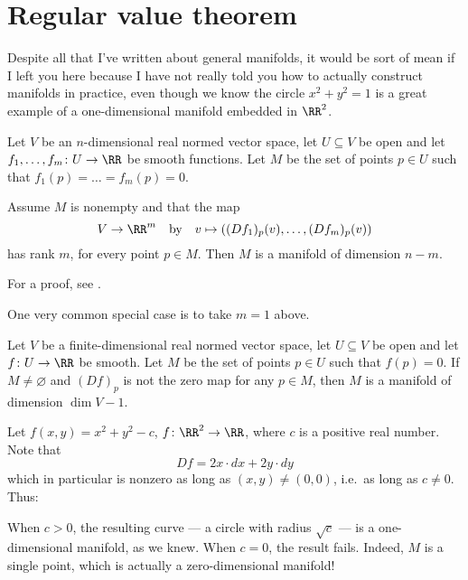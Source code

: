 \section{Regular value theorem}
Despite all that I've written about general manifolds,
it would be sort of mean if I left you here
because I have not really told you how to actually construct
manifolds in practice, even though we know the circle
$x^2+y^2=1$ is a great example of a one-dimensional
manifold embedded in $\RR^2$.

\begin{theorem}
	Let $V$ be an $n$-dimensional real normed vector
	space, let $U \subseteq V$ be open
	and let $f_1, \dots, f_m \colon U \to \RR$
	be smooth functions.
	Let $M$ be the set of points $p \in U$
	such that $f_1(p) = \dots = f_m(p) = 0$.

	Assume $M$ is nonempty and that the map
	\[ V \to \RR^m \quad\text{by}\quad
		v \mapsto \left( (Df_1)_p(v), \dots, (Df_m)_p(v) \right) \]
	has rank $m$, for every point $p \in M$.
	Then $M$ is a manifold of dimension $n-m$.
\end{theorem}
For a proof, see \cite[Theorem 6.3]{ref:manifolds}.

One very common special case is to take $m = 1$ above.
\begin{corollary}
	Let $V$ be a finite-dimensional real normed vector
	space, let $U \subseteq V$ be open
	and let $f \colon U \to \RR$ be smooth.
	Let $M$ be the set of points $p \in U$
	such that $f(p) = 0$.
	If $M \neq \varnothing$ and $(Df)_p$ is not the zero map for any $p \in M$,
	then $M$ is a manifold of dimension $\dim V-1$.
\end{corollary}

\begin{example}
	[The circle $x^2+y^2-c=0$]
	Let $f(x,y) = x^2+y^2 - c$, $f \colon \RR^2 \to \RR$,
	where $c$ is a positive real number.
	Note that
	\[ Df = 2x \cdot dx + 2y \cdot dy \]
	which in particular is nonzero
	as long as $(x,y) \neq (0,0)$, i.e.\ as long as $c \neq 0$.
	Thus:
	\begin{itemize}
		\ii When $c > 0$, the resulting curve ---
		a circle with radius $\sqrt c$ ---
		is a one-dimensional manifold, as we knew.
		\ii When $c = 0$, the result fails.
		Indeed, $M$ is a single point,
		which is actually a zero-dimensional manifold!
	\end{itemize}
\end{example}


